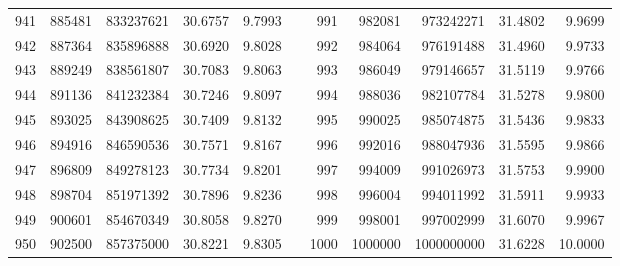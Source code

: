 \begin{longtable}{rrrrrrrrrrr}
941&885481&833237621&30.6757&9.7993&&991&982081&973242271&31.4802&9.9699\\
942&887364&835896888&30.6920&9.8028&&992&984064&976191488&31.4960&9.9733\\
943&889249&838561807&30.7083&9.8063&&993&986049&979146657&31.5119&9.9766\\
944&891136&841232384&30.7246&9.8097&&994&988036&982107784&31.5278&9.9800\\
945&893025&843908625&30.7409&9.8132&&995&990025&985074875&31.5436&9.9833\\
946&894916&846590536&30.7571&9.8167&&996&992016&988047936&31.5595&9.9866\\
947&896809&849278123&30.7734&9.8201&&997&994009&991026973&31.5753&9.9900\\
948&898704&851971392&30.7896&9.8236&&998&996004&994011992&31.5911&9.9933\\
949&900601&854670349&30.8058&9.8270&&999&998001&997002999&31.6070&9.9967\\
950&902500&857375000&30.8221&9.8305&&1000&1000000&1000000000&31.6228&10.0000\\
\end{longtable}
